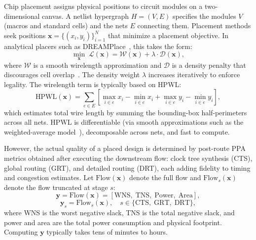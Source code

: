 \documentclass[sigconf,anonymous,review,9pt]{acmart}
\begin{document}
Chip placement assigns physical positions to circuit modules on a
two-dimensional canvas. A netlist hypergraph $H = (V, E)$ specifies the
modules $V$ (macros and standard cells) and the nets $E$ connecting
them. Placement methods seek positions
$\mathbf{x} = \{(x_i, y_i)\}_{i=1}^{N}$ that minimize a placement
objective. In analytical placers such as
DREAMPlace~\cite{lin2019dreamplace}, this takes the form:
\begin{equation}
\label{eq:placement}
\min_{\mathbf{x}} \; \mathcal{L}(\mathbf{x})
= \mathcal{W}(\mathbf{x}) + \lambda \cdot \mathcal{D}(\mathbf{x}),
\end{equation}
where $\mathcal{W}$ is a smooth wirelength approximation and
$\mathcal{D}$ is a density penalty that discourages cell
overlap~\cite{lu2015eplace}. The density weight $\lambda$ increases
iteratively to enforce legality. The wirelength term is typically based
on HPWL:
\begin{equation}
\label{eq:hpwl}
\mathrm{HPWL}(\mathbf{x}) = \sum_{e \in E}
\left[\max_{i \in e} x_i - \min_{i \in e} x_i
+ \max_{i \in e} y_i - \min_{i \in e} y_i\right],
\end{equation}
which estimates total wire length by summing the bounding-box
half-perimeters across all nets. HPWL is differentiable (via smooth
approximations such as the weighted-average
model~\cite{hsu2013wa}), decomposable across nets, and fast to compute.

However, the actual quality of a placed design is determined by
post-route PPA metrics obtained after executing the downstream flow:
clock tree synthesis (CTS), global routing (GRT), and detailed routing
(DRT), each adding fidelity to timing and congestion estimates. Let
$\mathrm{Flow}(\mathbf{x})$ denote the full flow and
$\mathrm{Flow}_s(\mathbf{x})$ denote the flow truncated at stage $s$:
\begin{equation}
\label{eq:ppa}
\mathbf{y} = \mathrm{Flow}(\mathbf{x})
= \left[\mathrm{WNS},\; \mathrm{TNS},\;
\mathrm{Power},\; \mathrm{Area}\right],
\end{equation}
\begin{equation}
\label{eq:partial_flow}
\mathbf{y}_s = \mathrm{Flow}_s(\mathbf{x}), \quad
s \in \{\text{CTS},\; \text{GRT},\; \text{DRT}\},
\end{equation}
where WNS is the worst negative slack, TNS is the total negative slack,
and power and area are the total power consumption and physical footprint.
Computing $\mathbf{y}$ typically takes tens of minutes to hours.
\end{document}
